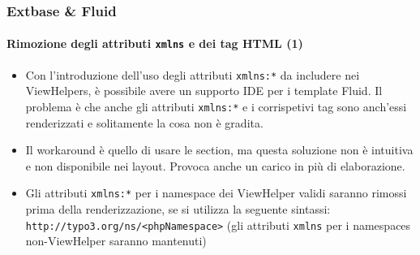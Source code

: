 \begin{frame}[fragile]
	\frametitle{Extbase \& Fluid}
	\framesubtitle{Rimozione degli attributi \texttt{xmlns} e dei tag HTML (1)}

	\lstset{basicstyle=\tiny\ttfamily}

	\begin{itemize}

		\item Con l'introduzione dell'uso degli attributi \texttt{xmlns:*} da includere nei
			ViewHelpers, è possibile avere un supporto IDE per i template Fluid.
			Il problema è che anche gli attributi \texttt{xmlns:*} e i corrispetivi tag
			sono anch'essi renderizzati e solitamente la cosa non è gradita.

		\item Il workaround è quello di usare le section, ma questa soluzione non è intuitiva e
			non disponibile nei layout. Provoca anche un carico in più di elaborazione.

		\item Gli attributi \texttt{xmlns:*} per i namespace dei ViewHelper validi saranno rimossi
			prima della renderizzazione, se si utilizza la seguente sintassi:
			\small\texttt{http://typo3.org/ns/<phpNamespace>}\normalsize\newline
			(gli attributi \texttt{xmlns} per i namespaces non-ViewHelper saranno mantenuti)

	\end{itemize}

\end{frame}


